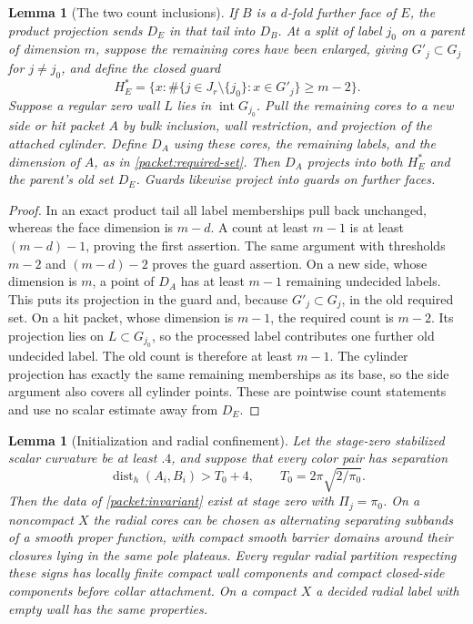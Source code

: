 \documentclass[11pt]{article}
\numberwithin{equation}{section}
\newtheorem{lemma}[theorem]{Lemma}
\theoremstyle{definition}
\theoremstyle{remark}
\begin{document}
\begin{lemma}[The two count inclusions]\label{packet:counts}
If $B$ is a $d$-fold further face of $E$, the product projection sends
$D_E$ in that tail into $D_B$.
At a split of label $j_0$ on a parent of dimension $m$, suppose the
remaining cores have been enlarged, giving $G'_j\subset G_j$ for
$j\ne j_0$, and define the closed guard
\begin{equation}\label{packet:guard}
 H_E^*=\bigl\{x:\#\{j\in J_r\setminus\{j_0\}:x\in G'_j\}
                      \ge m-2\bigr\}.
\end{equation}
Suppose a regular zero wall $L$ lies in $\operatorname{int}G_{j_0}$.
Pull the remaining cores to a new side or hit packet $A$ by bulk
inclusion, wall restriction, and projection of the attached cylinder.
Define $D_A$ using these cores, the remaining labels, and the dimension
of $A$, as in \eqref{packet:required-set}.
Then $D_A$ projects into both $H_E^*$ and the parent's old set $D_E$.
Guards likewise project into guards on further faces.
\end{lemma}

\begin{proof}
In an exact product tail all label memberships pull back unchanged,
whereas the face dimension is $m-d$.  A count at least $m-1$ is at
least $(m-d)-1$, proving the first assertion.  The same argument
with thresholds $m-2$ and $(m-d)-2$ proves the guard assertion.
On a new side, whose dimension is $m$, a point of $D_A$ has at least
$m-1$ remaining undecided labels.  This puts its projection in the
guard and, because $G'_j\subset G_j$, in the old required set.
On a hit packet, whose dimension is $m-1$, the required count is
$m-2$.  Its projection lies on $L\subset G_{j_0}$, so the processed
label contributes one further old undecided label.  The old count
is therefore at least $m-1$.  The cylinder projection has exactly
the same remaining memberships as its base, so the side argument
also covers all cylinder points.  These are pointwise count
statements and use no scalar estimate away from $D_E$.
\end{proof}

\begin{lemma}[Initialization and radial confinement]\label{packet:initialization}
Let the stage-zero stabilized scalar curvature be at least $.4$, and
suppose that every color pair has separation
\[
 \operatorname{dist}_h(A_i,B_i)>T_0+4,\qquad
 T_0=2\pi\sqrt{2/\pi_0}.
\]
Then the data of \cref{packet:invariant} exist at stage zero with
$\Pi_j=\pi_0$.  On a noncompact $X$ the radial cores can be chosen
as alternating separating subbands of a smooth proper function,
with compact smooth barrier domains around their closures lying in
the same pole plateaus.  Every regular radial partition respecting
these signs has locally finite compact wall components and compact
closed-side components before collar attachment.  On a compact $X$
a decided radial label with empty wall has the same properties.
\end{lemma}
\end{document}
